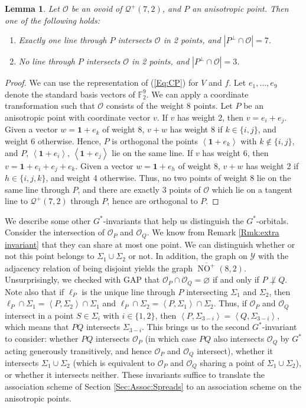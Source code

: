 \documentclass[a4paper]{article}
\newtheorem{lm}[thm]{Lemma}
\theoremstyle{definition}
\newcommand{\FF}{\mathbb F}
\newcommand{\vspan}[1]{\left \langle #1 \right \rangle}
\newcommand{\one}{\mathbf 1}
\newcommand{\mo}{\mathcal O}
\newcommand{\mq}{\mathcal Q}
\newcommand{\my}{\mathcal Y}
\DeclareMathOperator{\NO}{NO}
\newcommand{\nono}{\overline{\NO^+}(8,2)}
\begin{document}
\begin{lm}
 Let $\mo$ be an ovoid of $\mq^+(7,2)$, and $P$ an anisotropic point.
 Then one of the following holds:
 \begin{enumerate}
  \item Exactly one line through $P$ intersects $\mo$ in 2 points, and $|P^\perp \cap \mo| = 7$.
  \item No line through $P$ intersects $\mo$ in 2 points, and $|P^\perp \cap \mo| = 3$.
 \end{enumerate}
\end{lm}

\begin{proof}
 We can use the representation of (\ref{Eq:CP}) for $V$ and $f$.
 Let $e_1, \dots, e_9$ denote the standard basis vectors of $\FF_2^9$.
 We can apply a coordinate transformation such that $\mo$ consists of the weight 8 points.
 Let $P$ be an anisotropic point with coordinate vector $v$.
 If $v$ has weight $2$, then $v = e_i + e_j$.
 Given a vector $w = \one + e_k$ of weight $8$, $v+w$ has weight $8$ if $k \in \{i,j\}$, and weight $6$ otherwise.
 Hence, $P$ is orthogonal the points $\vspan{\one + e_k}$ with $k \notin \{i,j\}$, and $P$, $\vspan{\one + e_i}$, $\vspan{\one + e_j}$ lie on the same line.
 If $v$ has weight $6$, then $v = \one + e_i + e_j + e_k$.
 Given a vector $w = \one + e_h$ of weight 8, $v+w$ has weight 2 if $h \in \{i,j,k\}$, and weight 4 otherwise.
 Thus, no two points of weight 8 lie on the same line through $P$, and there are exactly 3 points of $\mo$ which lie on a tangent line to $\mq^+(7,2)$ through $P$, hence are orthogonal to $P$.
\end{proof}

We describe some other $G^*$-invariants that help us distinguish the $G^*$-orbitals.
Consider the intersection of $\mo_P$ and $\mo_Q$.
We know from Remark \ref{Rmk:extra invariant} that they can share at most one point.
We can distinguish whether or not this point belongs to $\Sigma_1 \cup \Sigma_2$ or not.
In addition, the graph on $\my$ with the adjacency relation of being disjoint yields the graph $\nono$.
Unsurprisingly, we checked with GAP that $\mo_P \cap \mo_Q = \varnothing$ if and only if $P \not \perp Q$.
Note also that if $\ell_P$ is the unique line through $P$ intersecting $\Sigma_1$ and $\Sigma_2$, then $\ell_P \cap \Sigma_1 = \vspan{P, \Sigma_2} \cap \Sigma_1$ and $\ell_P \cap \Sigma_2 = \vspan{P, \Sigma_1} \cap \Sigma_2$.
Thus, if $\mo_P$ and $\mo_Q$ intersect in a point $S \in \Sigma_i$ with $i \in \{1,2\}$, then $\vspan{P, \Sigma_{3-i}} = \vspan{Q, \Sigma_{3-i}}$, which means that $PQ$ intersects $\Sigma_{3-i}$.
This brings us to the second $G^*$-invariant to consider: whether $PQ$ intersects $\mo_P$ (in which case $PQ$ also intersects $\mo_Q$ by $G^*$ acting generously transitively, and hence $\mo_P$ and $\mo_Q$ intersect), whether it intersects $\Sigma_1 \cup \Sigma_2$ (which is equivalent to $\mo_P$ and $\mo_Q$ sharing a point of $\Sigma_1 \cup \Sigma_2$), or whether it intersects neither.
These invariants suffice to translate the association scheme of Section \ref{Sec:Assoc:Spreads} to an association scheme on the anisotropic points.
\end{document}
